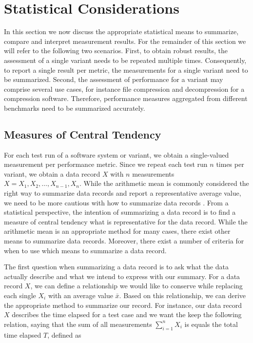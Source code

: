 \section{Statistical Considerations}\label{sec:statistical_considerations}
In this section we now discuss the appropriate statistical means to summarize,
compare and interpret measurement results. For the remainder of this section we
will refer to the following two scenarios. First, to obtain robust results, the
assessment of a single variant needs to be repeated multiple times.
Consequently, to report a single result per metric, the measurements for a
single variant need to be summarized. Second, the assessment of performance for
a variant may comprise several use cases, for instance file
compression and decompression for a compression software. Therefore, performance measures
aggregated from different benchmarks need to be summarized accurately. 

\subsection{Measures of Central Tendency}
For each test run of a software system or variant, we obtain a single-valued
measurement per performance metric. Since we repeat each test run $n$ times
per variant, we obtain a data record $X$ with $n$ measurements $X = X_1, X_2,
\ldots, X_{n-1}, X_n$. While the arithmetic mean is commonly considered the
right way to summarize data records and report a representative average
value, we need to be more cautious with how to summarize data records
\citep{fleming_how_1986,smith_characterizing_1988}. From a statistical
perspective, the intention of summarizing a data record is to find a measure of
central tendency what is representative for the data record.
While the arithmetic mean is an appropriate method for many cases, there exist
other means to summarize data records. Moreover, there exist a number of
criteria for when to use which means to summarize a data record. 

The first question when summarizing a data
record is to ask what the data actually describe and what we intend to express
with our summary. For a data record $X$, we can define a
relationship we would like to conserve while replacing each single $X_i$ with an
average value $\bar{x}$. Based on this relationship, we can derive the
appropriate method to summarize our record. For instance, our data record $X$
describes the time elapsed for a test case and we want the keep the following
relation, saying that the sum of all measurements $\sum_{i = 1}^{n} X_i$ is
equals the total time elapsed $T$, defined as

